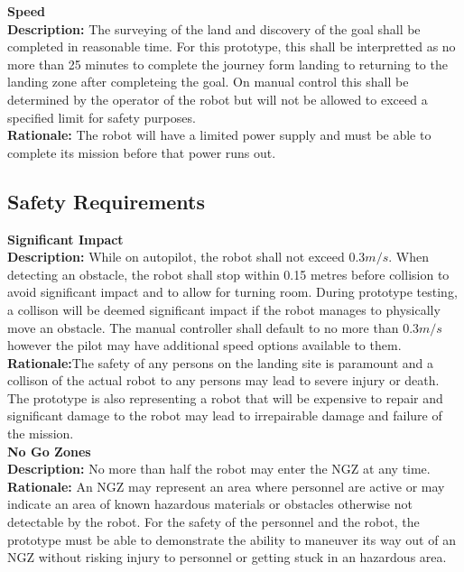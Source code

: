 \documentclass[10pt,a4paper,titlepage]{article}
\begin{document}
		\textbf {Speed}\\
		\textbf {Description:} The surveying of the land and discovery of the goal shall be completed in reasonable time. For this prototype, this shall be interpretted as no more than 25 minutes to complete the journey form landing to returning to the landing zone after completeing the goal. On manual control this shall be determined by the operator of the robot but will not be allowed to exceed a specified limit for safety purposes.\\
		\textbf {Rationale:} The robot will have a limited power supply and must be able to complete its mission before that power runs out. \\
		
	\subsection{Safety Requirements}
		\textbf {Significant Impact}\\
		\textbf {Description:} While on autopilot, the robot shall not exceed \begin{math}0.3 m/s\end{math}. When detecting an obstacle, the robot shall stop within 0.15 metres before collision to avoid significant impact and to allow for turning room. During prototype testing, a collison will be deemed significant impact if the robot manages to physically move an obstacle. The manual controller shall default to no more than \begin{math}0.3 m/s\end{math} however the pilot may have additional speed options available to them.\\
		\textbf {Rationale:}The safety of any persons on the landing site is paramount and a collison of the actual robot to any persons may lead to severe injury or death. The prototype is also representing a robot that will be expensive to repair and significant damage to the robot may lead to irrepairable damage and failure of the mission.\\

		\textbf{No Go Zones}\\
		\textbf {Description:} No more than half the robot may enter the NGZ at any time.\\
		\textbf{Rationale:} An NGZ may represent an area where personnel are active or may indicate an area of known hazardous materials or obstacles otherwise not detectable by the robot. For the safety of the personnel and the robot, the prototype must be able to demonstrate the ability to maneuver its way out of an NGZ without risking injury to personnel or getting stuck in an hazardous area.\\
\end{document}
